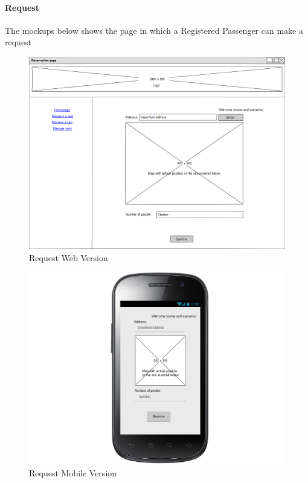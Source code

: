 \documentclass[a4paper,12pt,dvipsnames]{article}%
\begin{document}
\paragraph{Request}
The mockups below shows the page in which a Registered Passenger can make a request
\begin{figure}[H]
\centering
\includegraphics[scale=0.35]{mockups/request_web.png}
\caption{Request Web Version}
\end{figure}
\begin{figure}[H]
\centering
\includegraphics[scale=0.35]{mockups/request_mobile.png}
\caption{Request Mobile Version}
\end{figure}
\break
\end{document}
